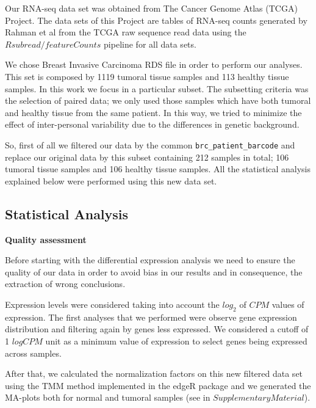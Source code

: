 \documentclass[9pt,twocolumn,twoside]{gsajnl}
\begin{document}
Our RNA-seq data set was obtained from The Cancer Genome Atlas (TCGA) Project. The data sets of this Project are tables of RNA-seq counts generated by Rahman et al \citep{Rahman15112015} from the TCGA raw sequence read data using the $Rsubread / featureCounts$ pipeline for all data sets.
\vspace{2 mm}

We chose Breast Invasive Carcinoma RDS file in order to perform our analyses. This set is composed by 1119 tumoral tissue samples and 113 healthy tissue samples. In this work we focus in a particular subset. The subsetting criteria was the selection of paired data; we only used those samples which have both tumoral and healthy tissue from the same patient. In this way, we tried to minimize the effect of inter-personal variability due to the differences in genetic background.
\vspace{2 mm}
  
So, first of all we filtered our data by the common \verb+brc_patient_barcode+ and replace our original data by this subset containing 212 samples in total; 106 tumoral tissue samples and 106 healthy tissue samples. All the statistical analysis explained below were performed using this new data set.


\subsection*{Statistical Analysis} 
\vspace{2mm}

\textbf{Quality assessment}
\vspace{2mm}

Before starting with the differential expression analysis we need to ensure the quality of our data in order to avoid bias in our results and in consequence, the extraction of wrong conclusions. 
\vspace{2mm}

Expression levels were considered taking into account the $log_{2}$ of $CPM$ values of expression. The first analyses that we performed were observe gene expression distribution and filtering again by genes less expressed. We considered a cutoff of 1 $log CPM$ unit as a minimum value of expression to select genes being expressed across samples.
\vspace{2mm}

After that, we calculated the normalization factors on this new filtered data set using the TMM method implemented in the edgeR package and we generated the MA-plots both for normal and tumoral samples (see in $Supplementary Material$).
\vspace{2mm}
\end{document}
